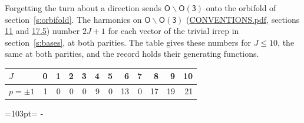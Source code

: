 \documentclass[10pt,a4paper]{article}
\newcommand{\needspace}[1]{\par\penalty-100\begingroup\dimen0=#1\relax\dimen2=\pagegoal
  \advance\dimen2-\pagetotal\ifdim\dimen0>\dimen2\relax\ifdim\dimen2>0pt\vfil\break\fi\fi
  \endgroup}
\numberwithin{equation}{section}
\newcommand{\grp}[1]{\mathsf{#1}}
\begin{document}
Forgetting the turn about a direction sends $\grp{O}\backslash\grp{O(3)}$ onto the orbifold of section~\ref{s:orbifold}.
The harmonics on $\grp{O}\backslash\grp{O(3)}$ (\href{../../CONVENTIONS.pdf}{CONVENTIONS.pdf}, sections \href{../../CONVENTIONS.pdf\#conv.11}{11} and \href{../../CONVENTIONS.pdf\#conv.17.5}{17.5}) number $2J + 1$ for each vector of the trivial irrep in section~\ref{s:bases}, at both parities. The table gives these numbers for $J \le 10$, the same at both parities, and the record holds their generating functions.
{\small\setlength{\tabcolsep}{4pt}\begin{longtable}{@{}lrrrrrrrrrrr@{}}\toprule
$J$ & 0 & 1 & 2 & 3 & 4 & 5 & 6 & 7 & 8 & 9 & 10\\\midrule\endhead
\bottomrule\endfoot\endlastfoot
$p = \pm 1$ & 1 & 0 & 0 & 0 & 9 & 0 & 13 & 0 & 17 & 19 & 21\\
\bottomrule\end{longtable}}
\needspace{103pt}
\end{document}
